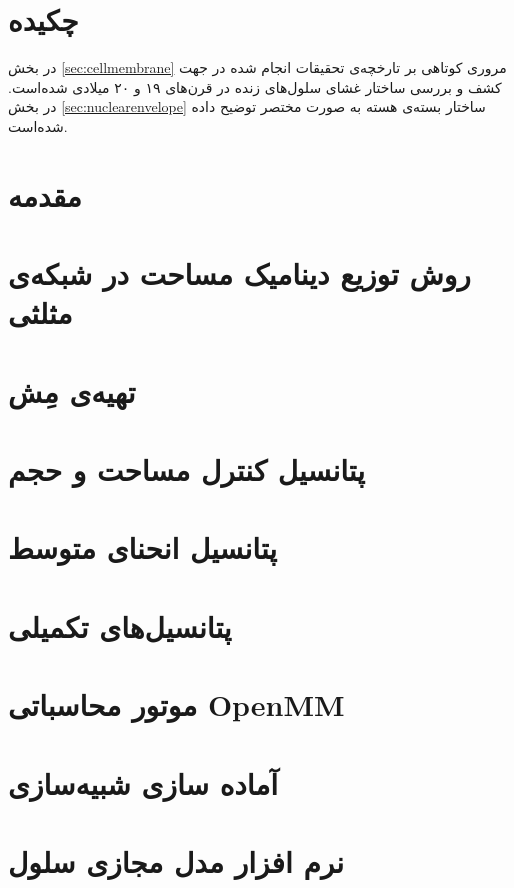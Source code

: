 \setRL
\clearpage
\def \MemMethod {\Mempath /MembraneMethod}

\section{
چکیده
}
در بخش
\ref{sec:cellmembrane}
مروری کوتاهی بر تارخچه‌ی تحقیقات انجام شده در جهت کشف و بررسی ساختار غشای سلول‌های زنده در قرن‌های ۱۹ و ۲۰ میلادی شده‌است. در بخش
\ref{sec:nuclearenvelope}
ساختار بسته‌ی هسته به صورت مختصر توضیح داده شده‌است.

\section{
مقدمه
}



\section{
روش توزیع دینامیک مساحت در شبکه‌ی مثلثی
}


\section{
تهیه‌ی مِش
}


\section{
پتانسیل کنترل مساحت و حجم
}


\section{
پتانسیل انحنای متوسط
}



\section{
پتانسیل‌های تکمیلی
\label{sec:auxPotentials}
}




\section{
موتور محاسباتی
OpenMM
}


\section{
آماده سازی شبیه‌سازی
}


\section{
نرم افزار مدل مجازی سلول
}




